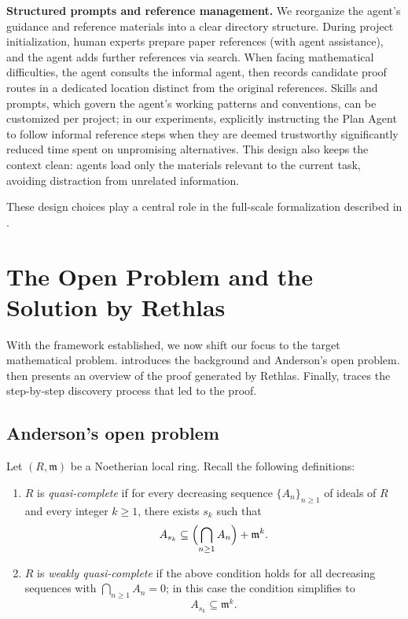 \documentclass[]{pkuai4m}
\theoremstyle{plain}
\theoremstyle{definition}
\begin{document}
\textbf{Structured prompts and reference management.} We reorganize the agent's guidance and reference materials into a clear directory structure. During project initialization, human experts prepare paper references (with agent assistance), and the agent adds further references via search. When facing mathematical difficulties, the agent consults the informal agent, then records candidate proof routes in a dedicated location distinct from the original references. Skills and prompts, which govern the agent's working patterns and conventions, can be customized per project; in our experiments, explicitly instructing the Plan Agent to follow informal reference steps when they are deemed trustworthy significantly reduced time spent on unpromising alternatives. This design also keeps the context clean: agents load only the materials relevant to the current task, avoiding distraction from unrelated information.

\medskip
\noindent These design choices play a central role in the full-scale formalization described in .

\section{The Open Problem and the Solution by Rethlas}\label{sec:rethlas_results}

With the framework established, we now shift our focus to the target mathematical problem.  introduces the background and Anderson's open problem.  then presents an overview of the proof generated by Rethlas. Finally,  traces the step-by-step discovery process that led to the proof.

\subsection{Anderson's open problem}\label{subsec:open_problem}


Let \((R, \mathfrak{m})\) be a Noetherian local ring. Recall the following definitions:
\begin{enumerate}[leftmargin=*]
    \item $R$ is \emph{quasi-complete} if for every decreasing sequence $\{A_n\}_{n\ge 1}$ of ideals of $R$ and every integer \(k \ge 1\), there exists \(s_k\) such that  
    \[
    A_{s_k} \subseteq \Bigl(\bigcap_{n\ge 1} A_n\Bigr) + \mathfrak{m}^k.
    \]

    \item $R$ is \emph{weakly quasi-complete} if the above condition holds for all decreasing sequences with \(\bigcap_{n \ge 1} A_n = 0\); in this case the condition simplifies to  
  \[
  A_{s_k} \subseteq \mathfrak{m}^k.
  \]
\end{enumerate}
\end{document}
